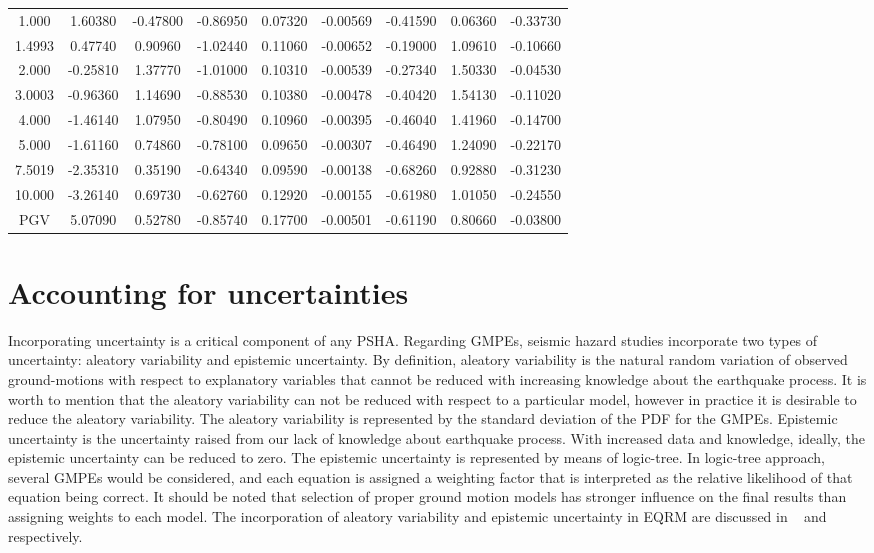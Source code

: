 \begin{table}
\begin{tabular}{ccccccccc}
1.000   & 1.60380  & -0.47800  & -0.86950  & 0.07320   & -0.00569 & -0.41590 & 0.06360  & -0.33730 \\
1.4993  & 0.47740  & 0.90960   & -1.02440  & 0.11060   & -0.00652 & -0.19000 & 1.09610  & -0.10660 \\
2.000   & -0.25810 & 1.37770   & -1.01000  & 0.10310   & -0.00539 & -0.27340 & 1.50330  & -0.04530 \\
3.0003  & -0.96360 & 1.14690   & -0.88530  & 0.10380   & -0.00478 & -0.40420 & 1.54130  & -0.11020 \\
4.000   & -1.46140 & 1.07950   & -0.80490  & 0.10960   & -0.00395 & -0.46040 & 1.41960  & -0.14700 \\
5.000   & -1.61160 & 0.74860   & -0.78100  & 0.09650   & -0.00307 & -0.46490 & 1.24090  & -0.22170 \\
7.5019  & -2.35310 & 0.35190   & -0.64340  & 0.09590   & -0.00138 & -0.68260 & 0.92880  & -0.31230 \\
10.000  & -3.26140 & 0.69730   & -0.62760  & 0.12920   & -0.00155 & -0.61980 & 1.01050  & -0.24550 \\
PGV     & 5.07090  & 0.52780   & -0.85740  & 0.17700   & -0.00501 & -0.61190 & 0.80660  & -0.03800 \\
\hline
\end{tabular}
\end{table}


\normalsize



\section{Accounting for uncertainties}\label{sec:uncertain}
Incorporating uncertainty is a critical component of any PSHA.
Regarding GMPEs, seismic hazard studies incorporate two types of
uncertainty: aleatory variability and epistemic uncertainty. By
definition, aleatory variability is the natural random variation of
observed ground-motions with respect to explanatory variables that
cannot be reduced with increasing knowledge about the earthquake
process. It is worth to mention that the aleatory variability can
not be reduced with respect to a particular model, however in
practice it is desirable to reduce the aleatory variability. The
aleatory variability is represented by the standard deviation of the
PDF for the GMPEs. Epistemic uncertainty is the uncertainty raised
from our lack of knowledge about earthquake process. With increased
data and knowledge, ideally, the epistemic uncertainty can be
reduced to zero. The epistemic uncertainty is represented by means
of logic-tree. In logic-tree approach, several GMPEs would be
considered, and each equation is assigned a weighting factor that is
interpreted as the relative likelihood of that equation being
correct. It should be noted that selection of proper ground motion
models has stronger influence on the final results than assigning
weights to each model. The incorporation of aleatory variability and
epistemic uncertainty in EQRM are discussed in
~ and ~
respectively.




